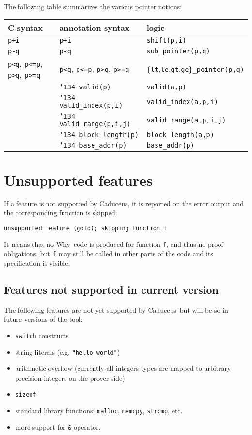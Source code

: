 \documentclass[12pt,a4paper,twoside,openright]{report}
\newcommand{\why}{\textsf{Why}}
\newcommand{\caduceus}{\textsf{Caduceus}}
\def\valid{\char'134 valid}
\def\block{\char'134 block}
\def\base{\char'134 base}
\begin{document}
The following table summarizes the various pointer notions:
\begin{center}
  \begin{tabular}{l|l|l}
    C syntax & annotation syntax & logic \\\hline
    \texttt{p+i} & \texttt{p+i} & \texttt{shift(p,i)} \\
    \texttt{p-q} & \texttt{p-q} & \texttt{sub\_pointer(p,q)} \\
    \texttt{p<q}, \texttt{p<=p}, \texttt{p>q}, \texttt{p>=q} & 
    \texttt{p<q}, \texttt{p<=p}, \texttt{p>q}, \texttt{p>=q} &
    \{\texttt{lt},\texttt{le},\texttt{gt},\texttt{ge}\}\texttt{\_pointer(p,q)}
    \\
        & \texttt{\valid(p)} & \texttt{valid(a,p)} \\
        & \texttt{\valid\_index(p,i)} & \texttt{valid\_index(a,p,i)} \\
        & \texttt{\valid\_range(p,i,j)} & \texttt{valid\_range(a,p,i,j)} \\
        & \texttt{\block\_length(p)} & \texttt{block\_length(a,p)} \\
        & \texttt{\base\_addr(p)} & \texttt{base\_addr(p)}
  \end{tabular}
\end{center}


\section{Unsupported features}

If a feature is not supported by \caduceus, it is reported on the
error output and the corresponding function is skipped:
\begin{verbatim}
unsupported feature (goto); skipping function f
\end{verbatim}
It means that no \why\ code is produced for function \texttt{f}, and
thus no proof obligations, but \texttt{f} may still be called in other
parts of the code and its specification is visible.

\subsection{Features not supported in current version}
The following features are not yet supported by \caduceus\ but will be
so in future versions of the tool:
\begin{itemize}
\item \texttt{switch} constructs
\item string literals (e.g. \texttt{"hello world"})
\item arithmetic overflow (currently all integers types are mapped to
  arbitrary precision integers on the prover side)
\item \texttt{sizeof}
\item standard library functions: \texttt{malloc}, \texttt{memcpy},
  \texttt{strcmp}, etc.
\item more support for \verb|&| operator.
\end{itemize}
\end{document}
